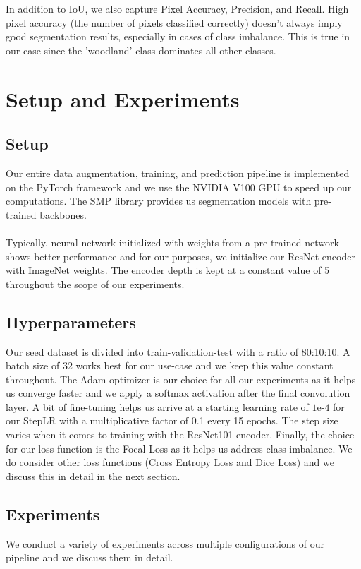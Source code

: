 \documentclass[conference]{IEEEtran}
\begin{document}
In addition to IoU, we also capture Pixel Accuracy, Precision, and Recall. High pixel accuracy (the number of pixels classified correctly) doesn't always imply good segmentation results, especially in cases of class imbalance. This is true in our case since the 'woodland' class dominates all other classes.

\section{Setup and Experiments}

\subsection{Setup}
Our entire data augmentation, training, and prediction pipeline is implemented on the PyTorch framework and we use the NVIDIA V100 GPU to speed up our computations. The SMP library \cite{Yakubovskiy:2019} provides us segmentation models with pre-trained backbones. 
\\
\\Typically, neural network initialized with weights from a pre-trained network shows better performance and for our purposes, we initialize our ResNet encoder with ImageNet weights. The encoder depth is kept at a constant value of 5 throughout the scope of our experiments. 

\subsection{Hyperparameters}
Our seed dataset is divided into train-validation-test with a ratio of 80:10:10. A batch size of 32 works best for our use-case and we keep this value constant throughout. The Adam optimizer is our choice for all our experiments as it helps us converge faster and we apply a softmax activation after the final convolution layer. A bit of fine-tuning helps us arrive at a starting learning rate of $1\text{e-}4$ for our StepLR with a multiplicative factor of 0.1 every 15 epochs. The step size varies when it comes to training with the ResNet101 encoder. Finally, the choice for our loss function is the Focal Loss as it helps us address class imbalance. We do consider other loss functions (Cross Entropy Loss and Dice Loss) and we discuss this in detail in the next section.
\subsection{Experiments}
We conduct a variety of experiments across multiple configurations of our pipeline and we discuss them in detail.
\end{document}
